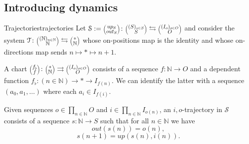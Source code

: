 \documentclass[12pt, a4paper]{article}
\theoremstyle{definition}
\theoremstyle{plain}
\theoremstyle{plain}
\theoremstyle{plain}
\theoremstyle{plain}
\theoremstyle{plain}
\theoremstyle{remark}
\theoremstyle{remark}
\newcommand{\mc}[1]{\mathcal{#1}}
\newcommand{\lens}[2]{\scaleobj{0.6}{\begin{pmatrix} \scaleobj{1.3}{{#1}} \\ \scaleobj{1.3}{{#2}} \end{pmatrix}}}
\begin{document}
\subsection{Introducing dynamics}

\begin{tcdefinition}{Trajectories}{trajectories}
	Let $\mc{S} := \lens{up_S}{out_S} \colon \lens{(S)_{s \in S}}{S} \leftrightarrows \lens{(I_o)_{o \in O}}{O}$ and consider the system $\mc{T} \colon \lens{(\mathbb{N})_{n \in \mathbb{N}}}{\mathbb{N}} \leftrightarrows \lens{*}{\mathbb{N}}$ whose on-positions map is the identity and whose on-directions map sends $n \mapsto * \mapsto n+1$.

	A chart $\lens{f_\flat}{f} \colon \lens{*}{\mathbb{N}} \rightrightarrows \lens{(I_o)_{o \in O}}{O}$ consists of a sequence $f \colon \mathbb{N} \rightarrow O$ and a dependent function $f_\flat \colon (n \in \mathbb{N}) \rightarrow * \rightarrow I_{f(n)}$. We can identify the latter with a sequence $(a_0, a_1, \ldots)$ where each $a_i \in I_{f(i)}$.

	Given sequences $o \in \prod_{n \in \mathbb{N}} O$ and $i \in \prod_{n \in \mathbb{N}} I_{o(n)}$, an $i,o$-trajectory in $\mc{S}$ consists of a sequence $s \colon \mathbb{N} \rightarrow S$ such that for all $n \in \mathbb{N}$ we have
	$$out(s(n)) = o(n), $$
	$$s(n+1) = up(s(n), i(n)).$$
\end{tcdefinition}
\end{document}
